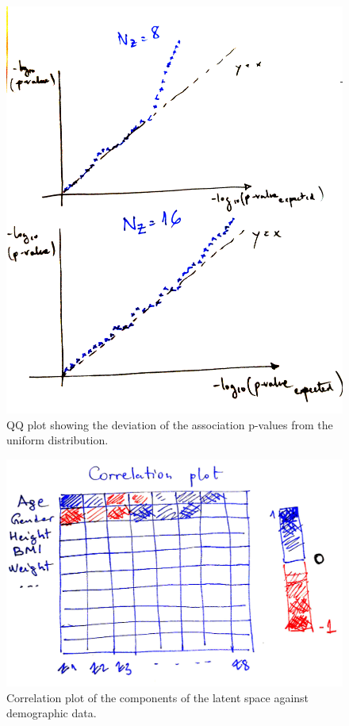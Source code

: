 \documentclass[twocolumn]{llncs}
\begin{document}
\begin{figure}
\includegraphics[width=\linewidth]{figs/qqplot_ncomp.jpg}
\caption{QQ plot showing the deviation of the association p-values from the uniform distribution.}
\label{fig_qqplot_pooled}
\end{figure}

\begin{figure}
\includegraphics[width=\linewidth]{figs/corrplot_z_vs_demographic_data.jpeg}
\caption{Correlation plot of the components of the latent space against demographic data.}
\end{figure}
\end{document}

